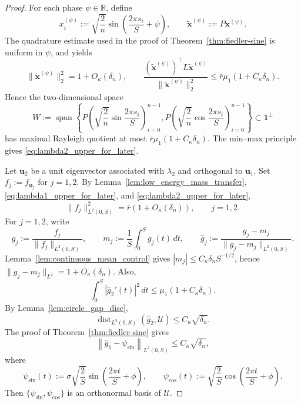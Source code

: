 \documentclass[11pt]{article}
\numberwithin{equation}{section}
\theoremstyle{definition}
\theoremstyle{remark}
\begin{document}
\begin{proof}
	For each phase $\psi\in\mathbb{R}$, define
	\[
	x_i^{(\psi)}:=
	\sqrt{\frac2n}\sin\left(\frac{2\pi s_i}{S}+\psi\right),
	\qquad
	\widetilde{\boldsymbol{x}}^{(\psi)}:=P\boldsymbol{x}^{(\psi)}.
	\]
	The quadrature estimate used in the proof of
	Theorem~\ref{thm:fiedler-sine} is uniform in $\psi$, and yields
	\[
	\|\widetilde{\boldsymbol{x}}^{(\psi)}\|_2^2=1+O_\kappa(\delta_n),
	\qquad
	\frac{(\widetilde{\boldsymbol{x}}^{(\psi)})^\top
		L\widetilde{\boldsymbol{x}}^{(\psi)}}
	{\|\widetilde{\boldsymbol{x}}^{(\psi)}\|_2^2}
	\le
	\bar r\mu_1(1+C_\kappa\delta_n).
	\]
	Hence the two-dimensional space
	\[
	W:=
	\operatorname{span}\left\{
	P\left(\sqrt{\frac2n}\sin\frac{2\pi s_i}{S}\right)_{i=0}^{n-1},
	P\left(\sqrt{\frac2n}\cos\frac{2\pi s_i}{S}\right)_{i=0}^{n-1}
	\right\}
	\subset \boldsymbol{1}^\perp
	\]
	has maximal Rayleigh quotient at most
	$\bar r\mu_1(1+C_\kappa\delta_n)$. The min--max principle gives
	\eqref{eq:lambda2_upper_for_later}.
	
	Let $\boldsymbol{u}_2$ be a unit eigenvector associated with $\lambda_2$
	and orthogonal to $\boldsymbol{u}_1$. Set $f_j:=f_{\boldsymbol{u}_j}$
	for $j=1,2$. By Lemma~\ref{lem:low_energy_mass_transfer},
	\eqref{eq:lambda1_upper_for_later}, and \eqref{eq:lambda2_upper_for_later},
	\[
	\|f_j\|_{L^2(0,S)}^2=\bar r(1+O_\kappa(\delta_n)),
	\qquad j=1,2.
	\]
	For $j=1,2$, write
	\[
	g_j:=\frac{f_j}{\|f_j\|_{L^2(0,S)}},
	\qquad
	m_j:=\frac1S\int_0^S g_j(t)\,dt,
	\qquad
	\widehat g_j:=\frac{g_j-m_j}{\|g_j-m_j\|_{L^2(0,S)}}.
	\]
	Lemma~\ref{lem:continuous_mean_control} gives
	$|m_j|\le C_\kappa\delta_n S^{-1/2}$, hence
	$\|g_j-m_j\|_{L^2}=1+O_\kappa(\delta_n)$. Also,
	\[
	\int_0^S|\widehat g_2'(t)|^2\,dt\le \mu_1(1+C_\kappa\delta_n).
	\]
	By Lemma~\ref{lem:circle_gap_disc},
	\begin{equation}\label{eq:g2_close_U}
		\operatorname{dist}_{L^2(0,S)}(\widehat g_2,\mathcal U)
		\le C_\kappa\sqrt{\delta_n}.
	\end{equation}
	The proof of Theorem~\ref{thm:fiedler-sine} gives
	\begin{equation}\label{eq:g1_close_sine_for_cosine}
		\left\|
		\widehat g_1-\psi_{\sin}
		\right\|_{L^2(0,S)}
		\le
		C_\kappa\sqrt{\delta_n},
	\end{equation}
	where
	\[
	\psi_{\sin}(t):=
	\sigma\sqrt{\frac2S}\sin\left(\frac{2\pi t}{S}+\phi\right),
	\qquad
	\psi_{\cos}(t):=
	\sqrt{\frac2S}\cos\left(\frac{2\pi t}{S}+\phi\right).
	\]
	Then $\{\psi_{\sin},\psi_{\cos}\}$ is an orthonormal basis of
	$\mathcal U$.
	

\end{proof}
\end{document}
